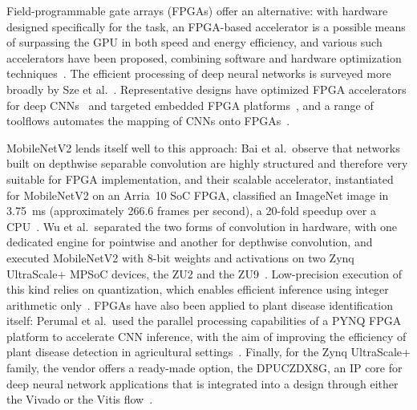 Field-programmable gate arrays (FPGAs) offer an alternative: with hardware
designed specifically for the task, an FPGA-based accelerator is a possible
means of surpassing the GPU in both speed and energy efficiency, and various
such accelerators have been proposed, combining software and hardware
optimization techniques~\cite{guo2019survey}. The efficient processing of deep
neural networks is surveyed more broadly by Sze et
al.~\cite{sze2017efficient}. Representative designs have optimized FPGA
accelerators for deep CNNs~\cite{zhang2015optimizing} and targeted embedded
FPGA platforms~\cite{qiu2016goingdeeper}, and a range of toolflows automates
the mapping of CNNs onto FPGAs~\cite{venieris2018toolflows}.

MobileNetV2 lends itself well to this approach: Bai et al.\ observe that
networks built on depthwise separable convolution are highly structured and
therefore very suitable for FPGA implementation, and their scalable
accelerator, instantiated for MobileNetV2 on an Arria~10 SoC FPGA, classified
an ImageNet image in \SI{3.75}{\milli\second} (approximately 266.6 frames per
second), a 20-fold speedup over a CPU~\cite{bai2018dwsep}. Wu et al.\
separated the two forms of convolution in hardware, with one dedicated engine
for pointwise and another for depthwise convolution, and executed MobileNetV2
with 8-bit weights and activations on two Zynq UltraScale+ MPSoC devices, the
ZU2 and the ZU9~\cite{wu2019high}. Low-precision execution of this kind relies
on quantization, which enables efficient inference using integer arithmetic
only~\cite{jacob2018quantization,krishnamoorthi2018whitepaper}. FPGAs have
also been applied to plant disease identification itself: Perumal et al.\
used the parallel processing capabilities of a PYNQ FPGA platform to
accelerate CNN inference, with the aim of improving the efficiency of plant
disease detection in agricultural settings~\cite{perumal2024cnn}. Finally,
for the Zynq UltraScale+ family, the vendor offers a ready-made option, the
DPUCZDX8G, an IP core for deep neural network applications that is integrated
into a design through either the Vivado or the Vitis
flow~\cite{xilinx_pg338}.

